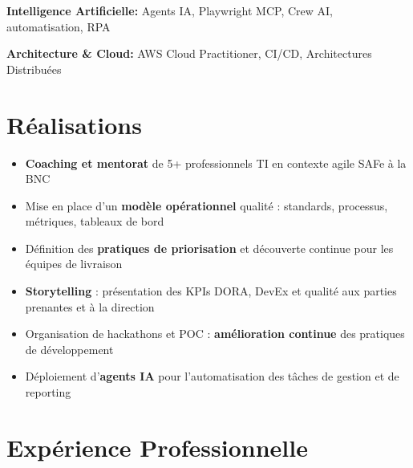\documentclass[11pt,a4paper]{article}
\begin{document}
\textbf{Intelligence Artificielle:} Agents IA, Playwright MCP, Crew AI, automatisation, RPA

\textbf{Architecture \& Cloud:} AWS Cloud Practitioner, CI/CD, Architectures Distribuées

\vspace{6pt}

\section*{Réalisations}
\begin{itemize}
    \item \textbf{Coaching et mentorat} de 5+ professionnels TI en contexte agile SAFe à la BNC
    \item Mise en place d'un \textbf{modèle opérationnel} qualité : standards, processus, métriques, tableaux de bord
    \item Définition des \textbf{pratiques de priorisation} et découverte continue pour les équipes de livraison
    \item \textbf{Storytelling} : présentation des KPIs DORA, DevEx et qualité aux parties prenantes et à la direction
    \item Organisation de hackathons et POC : \textbf{amélioration continue} des pratiques de développement
    \item Déploiement d'\textbf{agents IA} pour l'automatisation des tâches de gestion et de reporting
\end{itemize}

\section*{Expérience Professionnelle}
\end{document}

